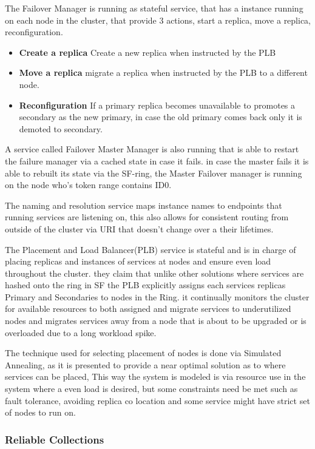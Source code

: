 \documentclass[a4paper,10pt,titlepage]{report}
\begin{document}
The Failover Manager is running as stateful service, that has a instance running on each node in the cluster, that provide 3 actions, start a replica, move a replica, reconfiguration.

\begin{itemize}
\item \textbf{Create a replica} Create a new replica when instructed by the PLB
\item \textbf{Move a replica} migrate a replica when instructed by the PLB to a different node.
    \item \textbf{Reconfiguration} If a primary replica becomes unavailable to promotes a secondary as the new primary, in case the old primary comes back only it is demoted to secondary. 
\end{itemize}

A service called Failover Master Manager is also running that is able to restart the failure manager via a cached state in case it fails. in case the master fails it is able to rebuilt its state via the SF-ring, the Master Failover manager is running on the node who's token range contains ID0.

The naming and resolution service maps instance names to endpoints that running services are listening on, this also allows for consistent routing from outside of the cluster via URI that doesn't change over a their lifetimes. 

The Placement and Load Balancer(PLB) service is stateful and is in charge of placing replicas and instances of services at nodes and ensure even load throughout the cluster. they claim that unlike other solutions where services are hashed onto the ring in SF the PLB explicitly assigns each services replicas Primary and Secondaries to nodes in the Ring. it continually monitors the cluster for available resources to both assigned and migrate services to underutilized nodes and migrates services away from a node that is about to be upgraded or is overloaded due to a long workload spike.

The technique used for selecting placement of nodes is done via Simulated Annealing, as it is presented to provide a near optimal solution as to where services can be placed, This way the system is modeled is via resource use in the system where a even load is desired, but some constraints need be met such as fault tolerance, avoiding replica co location and some service might have strict set of nodes to run on. 


\subsubsection{Reliable Collections}
\end{document}
